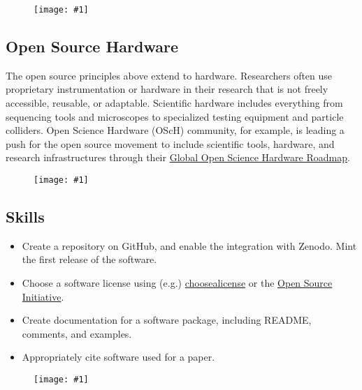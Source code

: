 \documentclass{article}
\newlength{\imgwidth}
\newcommand\scaledgraphics[2]{%
                
\settowidth{\imgwidth}{\texttt{[image: \#1]}}%
                
\setlength{\imgwidth}{\minof{\imgwidth}{#2\textwidth}}%
                
\texttt{[image: \#1]}%
                
}
\begin{document}
\begin{figure}
\scaledgraphics{b8bf1e7f-714b-4f3e-bde8-3fab49ffc6c6.png}{1}
\label{F15100861}
\end{figure}


\subsection{Open Source Hardware}\label{open-source-hardware}



The open source principles above extend to hardware. Researchers often use proprietary instrumentation or hardware in their research that is not freely accessible, reusable, or adaptable. Scientific hardware includes everything from sequencing tools and microscopes to specialized testing equipment and particle colliders. Open Science Hardware (OScH) community, for example, is leading a push for the open source movement to include scientific tools, hardware, and research infrastructures through their \href{http://openhardware.science/global-open-science-hardware-roadmap/}{Global Open Science Hardware Roadmap}.

\begin{figure}
\scaledgraphics{965a9b22-10b4-4501-a490-83443a94eafb.png}{1}
\label{F96692151}
\end{figure}


\subsection{Skills}\label{skills}


\begin{itemize}
\item Create a repository on GitHub, and enable the integration with Zenodo. Mint the first release of the software.


\item Choose a software license using (e.g.) \href{https://choosealicense.com/}{choosealicense} or the \href{https://opensource.org/licenses}{Open Source Initiative}.


\item Create documentation for a software package, including README, comments, and examples.


\item Appropriately cite software used for a paper.


\end{itemize}
\begin{figure}
\scaledgraphics{2b202773-ec41-4cde-8558-44800112ec6d.png}{1}
\label{F80746831}
\end{figure}
\end{document}
